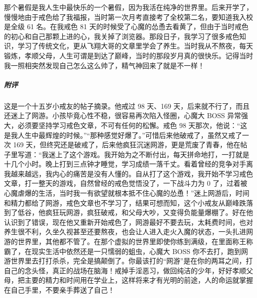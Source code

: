 \begin{case}
    那个暑假是我人生中最快乐的一个暑假，因为我活在纯净的世界里。后来开学了，慢慢地由于戒色给了我福报，当时第一次月考直接考了全校第二名，要知道我入校是全级 61 名。在我戒色 81 天的时候受了心魔的怂恿去看黄了，但由于当时戒色的初心和自己那颗上进的心，我关掉了浏览器。那段日子，我学习了很多戒色知识，学习了传统文化，更从飞翔大哥的文章里学会了养生。当时我从不熬夜，每天锻炼，孝顺父母，人生可谓是到达了巅峰，当时的那段岁月真的很快乐。记得当时我一照相突然发现自己怎么这么帅了，精气神回来了就是不一样！
    \subparagraph{附评} 这是一个十五岁小戒友的帖子摘录。他戒过 98 天、169 天，后来就不行了，而且还迷上了网游。小孩毕竟心性不稳，很容易再次陷入怪圈，心魔大 BOSS 异常强大，必须要坚持学习戒色文章，不可有任何的松懈。戒色 98 天那次，他说：“这是我人生中最辉煌的时候。”“那种感觉好爆了。”可惜后来他破戒了，虽然又戒了一次 169 天，但终究还是破戒了，后来他疯狂沉迷网游，更是荒废了青春，他在帖子里写道：“我迷上了这个游戏。我开始为之不断付出，每天拼命地打，一打就是十几个小时。晚上打到三点钟才睡觉，学习成绩一落千丈。看着曾经的竞争对手离我越来越远，我内心的痛苦是没有人懂的。自从打了这个游戏，我开始不学习戒色文章，打一整天的游戏，自然曾经的戒色觉悟没了，一下战斗力为 0 了，过着被心魔虐爆的生活，当时我一有欲望就根本抵不住心魔的怂恿！”迷上网游后，时间和精力都给了网游，戒色文章也不学习了，结果可想而知，这个小戒友从巅峰跌落到了低谷，他疯狂玩网游，疯狂破戒，和父母大吵，又变得负能量爆棚了。好在他认识到了错误，现在他又重新开始戒色了，网游最好不要去玩，太耗费时间，也对养生很不利，久坐久视甚至还要熬夜，也会让人进入走火入魔的状态，一头扎进网游的世界里，其他都不管了。在那个虚拟的世界里即使你练到满级，在里面称王称霸了，在现实生活中依然还是一只懦弱的蛆虫，心魔大 BOSS 你不去打，跑到网游世界里去打打杀杀，完全是搞颠倒了。你最该打的“网游”是在你的两耳之间，打自己的念头怪，真正的战场在脑海！戒掉手淫恶习，做回纯洁的少年，好好孝顺父母，把主要的精力和时间用在学业上，这样将来才有光明的前途，人的命运就掌握在自己手里，不要亲手葬送了自己！
\end{case}

